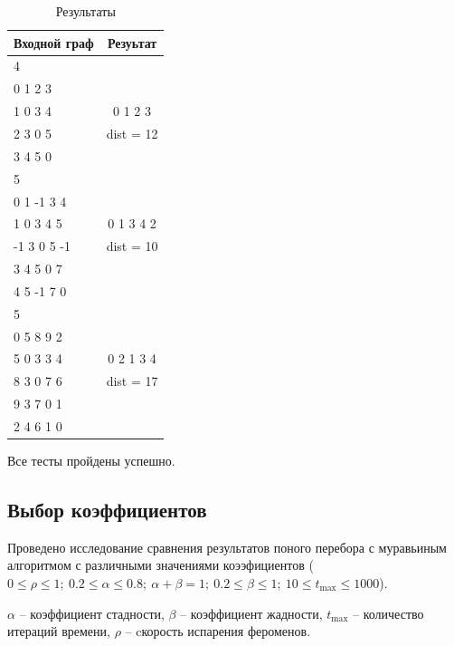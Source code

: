 \documentclass[a4paper,12pt]{article}
\begin{document}
\begin{table}[H]
    \caption{Результаты}
    \label{table:test_result}
    \centering
    \begin{tabular}{|l||c|}
        \hline
        Входной граф & Резуьтат \\
        \hline
        \hline
        \hline
        4 & \\
        0 1 2 3 & \\
        1 0 3 4 & 0 1 2 3 \\
        2 3 0 5 & dist = 12 \\
        3 4 5 0 & \\
        \hline
        5 & \\
        0 1 -1 3 4 & \\
        1 0 3 4 5 & 0 1 3 4 2 \\
        -1 3 0 5 -1 & dist = 10 \\
        3 4 5 0 7 & \\
        4 5 -1 7 0 & \\
        \hline
        5 & \\
        0 5 8 9 2 & \\
        5 0 3 3 4 & 0 2 1 3 4 \\
        8 3 0 7 6 & dist = 17 \\
        9 3 7 0 1 & \\
        2 4 6 1 0 & \\
        \hline
    \end{tabular}
\end{table}

Все тесты пройдены успешно.

\subsection{Выбор коэффициентов}

Проведено исследование сравнения результатов поного перебора с муравьиным алгоритмом с различными
значениями коээфициентов
($0 \le \rho \le 1;\ 0.2 \le \alpha \le 0.8;\ \alpha + \beta = 1;\ 0.2 \le \beta \le 1;\ 10 \le t_{\max} \le 1000$).

$\alpha$ -- коэффициент стадности, $\beta$ -- коэффициент жадности, $t_{\max}$ -- количество итераций времени, $\rho$ -- cкорость
испарения фероменов.
\end{document}

